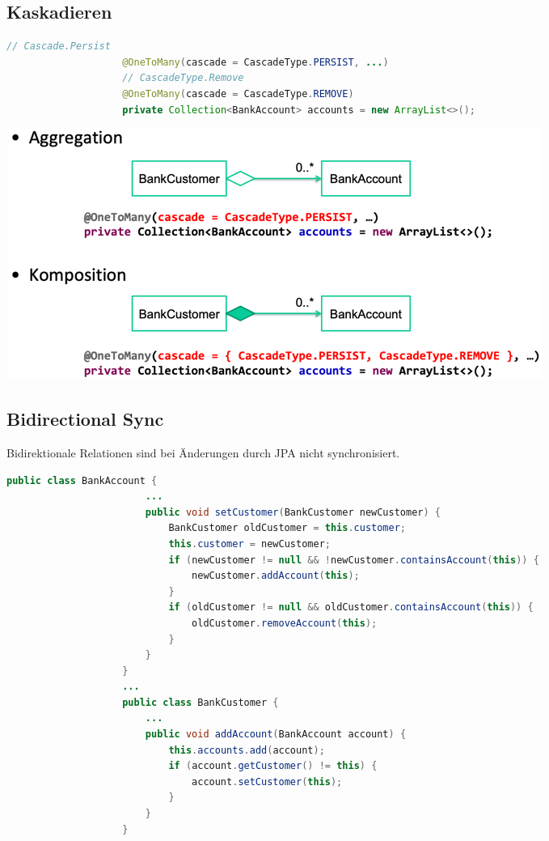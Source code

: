 \documentclass[a4paper, landscape, 8pt]{scrartcl}
\begin{document}
\begin{multicols*}{4}
        \subsection{Kaskadieren}
        \begin{lstlisting}[language=java]
                    // Cascade.Persist
                    @OneToMany(cascade = CascadeType.PERSIST, ...)
                    // CascadeType.Remove
                    @OneToMany(cascade = CascadeType.REMOVE)
                    private Collection<BankAccount> accounts = new ArrayList<>();
        \end{lstlisting}
        \includegraphics[width=0.9\columnwidth]{graphic/10-relations-with-dependencies}

        \subsection{Bidirectional Sync}
        Bidirektionale Relationen sind bei Änderungen durch JPA nicht synchronisiert.
        \begin{lstlisting}[language=java]
                    public class BankAccount {
                        ...
                        public void setCustomer(BankCustomer newCustomer) {
                            BankCustomer oldCustomer = this.customer;
                            this.customer = newCustomer;
                            if (newCustomer != null && !newCustomer.containsAccount(this)) {
                                newCustomer.addAccount(this);
                            }
                            if (oldCustomer != null && oldCustomer.containsAccount(this)) {
                                oldCustomer.removeAccount(this);
                            }
                        }
                    }
                    ...
                    public class BankCustomer {
                        ...
                        public void addAccount(BankAccount account) {
                            this.accounts.add(account);
                            if (account.getCustomer() != this) {
                                account.setCustomer(this);
                            }
                        }
                    }
        \end{lstlisting}


\end{multicols*}
\end{document}
